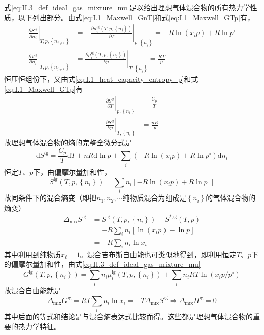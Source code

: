 \documentclass[main.tex]{subfiles}
\begin{document}
式\eqref{eq:II.3_def_ideal_gas_mixture_mu}足以给出理想气体混合物的所有热力学性质，以下列出部分。由式\eqref{eq:I.1_Maxwell_GnT}和式\eqref{eq:I.1_Maxwell_GTp}有，
\begin{align}
    \left.\frac{\partial S^\text{ig}}{\partial n_i}\right|_{T,p,\left\{n_{j\neq i}\right\}} & =-\left.\frac{\partial \mu^\text{ig}_i\left(T,p,\left\{n_j\right\}\right)}{\partial T}\right|_{p,\left\{n_j\right\}}=-R\ln\left(x_ip\right)+R\ln p^\circ \\
    \left.\frac{\partial V^\text{ig}}{\partial n_i}\right|_{T,p,\left\{n_{j\neq i}\right\}} & =\left.\frac{\partial\mu^\text{ig}_i\left(T,p,\left\{n_j\right\}\right)}{\partial p}\right|_{T,\left\{n_j\right\}}=\frac{RT}{p}
\end{align}
恒压恒组份下，又由式\eqref{eq:I.1_heat_capacity_entropy_p}和式\eqref{eq:I.1_Maxwell_GTp}有
\begin{align}
    \left.\frac{\partial S^\text{ig}}{\partial T}\right|_{p,\left\{n_i\right\}} & =\frac{C_p}{T} \\
    \left.\frac{\partial S^\text{ig}}{\partial p}\right|_{T,\left\{n_i\right\}} & =\frac{nR}{p}
\end{align}
故理想气体混合物的熵的完整全微分式是
\[\mathrm{d}S^\text{ig}=\frac{C_p}{T}\mathrm{d}T+nR\mathrm{d}\ln p+\sum_i\left(-R\ln\left(x_ip\right)+R\ln p^\circ\right)\mathrm{d}n_i\]
恒定$T$、$p$下，由偏摩尔量加和性，
\[S^\text{ig}\left(T,p,\left\{n_i\right\}\right)=\sum_in_i\left[-R\ln\left(x_ip\right)+R\ln p^\circ\right]\]
故同条件下的混合熵变（即把$n_1,n_2,\cdots$纯物质混合为组成是$\left\{n_i\right\}$的气体混合物的熵变）
\begin{align*}
    \Delta_\text{mix}S^\text{ig} & =S^\text{ig}\left(T,p,\left\{n_i\right\}\right)-S^\text{*,ig}\left(T,p\right) \\
                                 & =-R\sum_in_i\left[\ln\left(x_ip\right)-\ln p\right]                           \\
                                 & =-R\sum_in_i\ln x_i
\end{align*}
其中利用到纯物质$x_i=1$。混合吉布斯自由能也可类似地得到，即利用恒定$T$、$p$下的偏摩尔量加和性，由式\eqref{eq:II.3_def_ideal_gas_mixture_mu}
\[
    G^\text{ig}\left(T,p,\left\{n_i\right\}\right)=\sum_in_i\mu_i^\text{ig}\left(T,p,\left\{n_i\right\}\right)+\sum_in_iRT\ln\left(x_ip/p^\circ\right)
\]
故混合自由能就是
\[\Delta_\text{mix}G^\text{ig}=RT\sum_in_i\ln x_i=-T\Delta_\text{mix}S^\text{ig}\Rightarrow\Delta_\text{mix}H^\text{ig}=0\]
其中后面的等式和结论是与混合熵表达式比较而得。这些都是理想气体混合物的重要的热力学特征。
\end{document}
